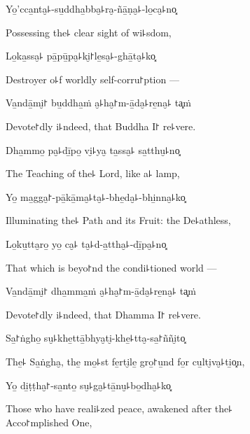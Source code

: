 Yo̱'cca̱nta̮꜕-su̱ddha̱bba̮꜕ra̮-ñā̱ṇa̮꜕-lo̱ca̮꜕no͓

\begin{english}
  Possessing the꜕ clear sight of wi꜕sdom,
\end{english}

Lo̱ka̱ssa̮꜕ pā̱pū̱pa̮꜕ki̮꜓le̱sa̮꜕-ghā̱ta̮꜕ko͓

\begin{english}
  Destroyer o꜕f worldly self-corru꜓ption ---
\end{english}

Va̱ndā̱mi̮꜓ bu̱ddha̱ṁ a̮꜕ha̮꜓m-ā̱da̮꜕re̱na̮꜕ ta͓ṁ

\begin{english}
  Devote꜓dly i꜕ndeed, that Buddha I꜓ re꜕vere.
\end{english}

Dha̱mmo̱ pa̮꜕dī̱po̱ vi̮꜕ya̮ ta̱ssa̮꜕ sa̱tthu̮꜕no͓

\begin{english}
  The Teaching of the꜕ Lord, like a꜕ lamp,
\end{english}

Yo̱ ma̱gga̮꜓-pā̱kā̱ma̮꜕ta̮꜕-bhe̱da̮꜕-bhi̱nna̮꜕ko͓

\begin{english}
  Illuminating the꜕ Path and its Fruit: the De꜕athless,
\end{english}

Lo̱ku̱tta̮ro̱ yo̱ ca̮꜕ ta̮꜕d-a̱ttha̮꜕-dī̱pa̮꜕no͓

\begin{english}
  That which is beyo꜓nd the condi꜕tioned world ---
\end{english}

Va̱ndā̱mi̮꜓ dha̱mma̱ṁ a̮꜕ha̮꜓m-ā̱da̮꜕re̱na̮꜕ ta͓ṁ

\begin{english}
  Devote꜓dly i꜕ndeed, that Dhamma I꜓ re꜕vere.
\end{english}

\clearpage

Sa̱꜓ṅgho̱ su̮꜕khe̱ttā̱bhya̮ti̮-khe̱꜕tta̮-sa̱꜓ññi̮to͓

\begin{english}
  The̱꜕ Sa̱ṅgha̮, the̱ mo̱꜕st fe̱rti̮le̱ gro̱꜓u̱nd fo̱r cu̱lti̮va̮꜕ti̱o͓n,
\end{english}

Yo̱ di̱ṭṭha̮꜓-sa̱nto̱ su̮꜕ga̮꜕tā̱nu̮꜕bo̱dha̮꜕ko͓

\begin{english}
  Those who have reali꜕zed peace, awakened after the꜕ \\Acco꜓mplished One,
\end{english}

